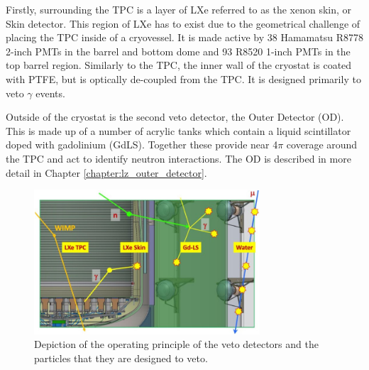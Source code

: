 \par
Firstly, surrounding the TPC is a layer of LXe referred to as the xenon skin, or Skin detector.
This region of LXe has to exist due to the geometrical challenge of placing the TPC inside of a cryovessel.
It is made active by 38 Hamamatsu R8778 2-inch PMTs in the barrel and bottom dome and 93 R8520 1-inch PMTs in the top barrel region.
Similarly to the TPC, the inner wall of the cryostat is coated with PTFE, but is optically de-coupled from the TPC.
It is designed primarily to veto $\gamma$ events.

\par
Outside of the cryostat is the second veto detector, the Outer Detector (OD).
This is made up of a number of acrylic tanks which contain a liquid scintillator doped with gadolinium (GdLS).
Together these provide near 4$\pi$ coverage around the TPC and act to identify neutron interactions.
The OD is described in more detail in Chapter \ref{chapter:lz_outer_detector}.

\begin{figure}
    \centering
    \includegraphics[width=0.75\textwidth]{Figures/LZ/lz_veto_plan.png}
    \caption{Depiction of the operating principle of the veto detectors and the particles that they are designed to veto.}
    \label{fig:LZ_Veto_Principle}
\end{figure}



